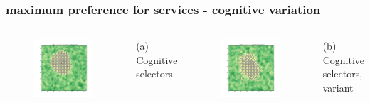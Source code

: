 \documentclass{beamer}
\begin{document}

\begin{frame}
\frametitle{maximum preference for services - cognitive variation}

\begin{columns}[t] %

\begin{figure}
\includegraphics[width=0.9\linewidth]{qual_cog2_2_0.png}
\end{figure}
(a) Cognitive selectors

\begin{figure}
\includegraphics[width=0.9\linewidth]{qual_cog_2_0.png}
\end{figure}
(b) Cognitive selectors, variant

\end{columns}
\end{frame}
\end{document}
